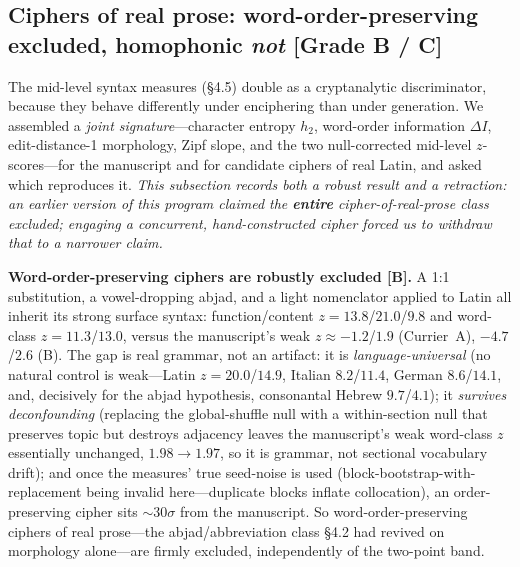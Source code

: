 \documentclass[11pt]{article}
\newcommand{\grade}[1]{{\small\textbf{[#1]}}}
\begin{document}
\subsection{Ciphers of real prose: word-order-preserving excluded, homophonic \emph{not}
\grade{Grade B / C}}
The mid-level syntax measures (\S4.5) double as a cryptanalytic discriminator, because they
behave differently under enciphering than under generation. We assembled a \emph{joint
signature}---character entropy $h_2$, word-order information $\Delta I$, edit-distance-1
morphology, Zipf slope, and the two null-corrected mid-level $z$-scores---for the manuscript
and for candidate ciphers of real Latin, and asked which reproduces it. \emph{This subsection
records both a robust result and a retraction: an earlier version of this program claimed the
\textbf{entire} cipher-of-real-prose class excluded; engaging a concurrent, hand-constructed
cipher forced us to withdraw that to a narrower claim.}

\textbf{Word-order-preserving ciphers are robustly excluded \grade{B}.} A 1:1 substitution,
a vowel-dropping abjad, and a light nomenclator applied to Latin all inherit its strong
surface syntax: function/content $z=13.8$/$21.0$/$9.8$ and word-class $z=11.3$/$13.0$, versus
the manuscript's weak $z\approx-1.2$/$1.9$ (Currier~A), $-4.7$/$2.6$ (B). The gap is real
grammar, not an artifact: it is \emph{language-universal} (no natural control is weak---Latin
$z=20.0$/$14.9$, Italian $8.2$/$11.4$, German $8.6$/$14.1$, and, decisively for the abjad
hypothesis, consonantal Hebrew $9.7$/$4.1$); it \emph{survives deconfounding} (replacing the
global-shuffle null with a within-section null that preserves topic but destroys adjacency
leaves the manuscript's weak word-class $z$ essentially unchanged, $1.98\!\to\!1.97$, so it is
grammar, not sectional vocabulary drift); and once the measures' true seed-noise is used
(block-bootstrap-with-replacement being invalid here---duplicate blocks inflate collocation),
an order-preserving cipher sits $\sim\!30\sigma$ from the manuscript. So word-order-preserving
ciphers of real prose---the abjad/abbreviation class \S4.2 had revived on morphology
alone---are firmly excluded, independently of the two-point band.
\end{document}
